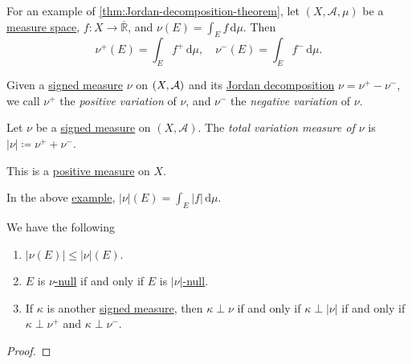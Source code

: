 \begin{eg}\label{eg:lec30}
	For an example of \autoref{thm:Jordan-decomposition-theorem}, let \((X, \mathcal{A}, \mu)\) be a \hyperref[def:measure-space]{measure space},
	\(f \colon X \to \overline{\mathbb{R}}\), and \(\nu(E) = \int_E f \,\mathrm{d} \mu\). Then
	\[
		\nu^+(E) = \int_E f^+ \,\mathrm{d} \mu,\quad \nu^-(E) = \int_E f^- \,\mathrm{d} \mu.
	\]
\end{eg}

\begin{definition}\label{def:positive-variation}\label{def:negative-variation}
	Given a \hyperref[def:signed-measure]{signed measure} \(\nu \) on \((X, \mathcal{\MakeUppercase{a}} )\) and its
	\hyperref[thm:Jordan-decomposition-theorem]{Jordan decomposition} \(\nu = \nu ^+ - \nu ^-\), we call \(\nu ^+\)
	the \emph{positive variation} of \(\nu \), and \(\nu ^-\) the \emph{negative variation} of \(\nu \).
\end{definition}

\begin{definition}\label{def:total-variation}
	Let \(\nu\) be a \hyperref[def:signed-measure]{signed measure} on \((X, \mathcal{A})\). The \emph{total variation measure of \(\nu\)} is
	\(\left\vert \nu \right\vert \coloneqq \nu^+ + \nu^-\).
\end{definition}
\begin{remark}
	This is a \hyperref[def:signed-measure]{positive measure} on $X$.
\end{remark}

\begin{eg}
	In the above \hyperref[eg:lec30]{example}, \(\left\vert \nu \right\vert (E) = \int_E \left\vert f \right\vert \,\mathrm{d} \mu\).
\end{eg}

\begin{lemma}
	We have the following
	\begin{enumerate}
		\item \(\left\vert \nu(E) \right\vert \leq \left\vert \nu \right\vert(E)\).
		\item \(E\) is \hyperref[def:null-set-for-a-signed-measure]{\(\nu\)-null} if and only if \(E\) is \hyperref[def:null-set-for-a-signed-measure]{\(\left\vert \nu \right\vert\)-null}.
		\item If \(\kappa\) is another \hyperref[def:signed-measure]{signed measure}, then \(\kappa \perp \nu\)
		      if and only if \(\kappa \perp \left\vert \nu \right\vert\) if and only if \(\kappa \perp \nu^+\) and \(\kappa \perp \nu^-\).
	\end{enumerate}
\end{lemma}
\begin{proof}
\end{proof}

